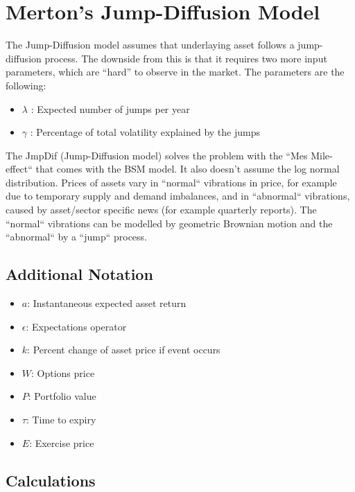 \documentclass{article}
\begin{document}
\section{Merton's Jump-Diffusion Model}
The Jump-Diffusion model assumes that underlaying asset follows a jump-diffusion process. The downside from this is that it requires two more input parameters, which are “hard” to observe in the market. The parameters are the following:
\begin{itemize}
    \item $\lambda$ : Expected number of jumps per year
    \item $\gamma$ : Percentage of total volatility explained by the jumps
\end{itemize}
The JmpDif (Jump-Diffusion model) solves the problem with the “Mes Mile-effect“ that comes with the BSM model. It also doesn’t assume the log normal distribution. Prices of assets vary in “normal“ vibrations in price, for example due to temporary supply and demand imbalances, and in “abnormal“ vibrations, caused by asset/sector specific news (for example quarterly reports). The “normal“ vibrations can be modelled by geometric Brownian motion and the “abnormal“ by a “jump“ process.
\subsection{Additional Notation}
\begin{itemize}
    \item $a$: Instantaneous expected asset return
    \item $\epsilon$: Expectations operator
    \item $k$: Percent change of asset price if event occurs
    \item $W$: Options price
    \item $P$: Portfolio value
    \item $\tau$: Time to expiry
    \item $E$: Exercise price
\end{itemize}
\subsection{Calculations}
\end{document}
